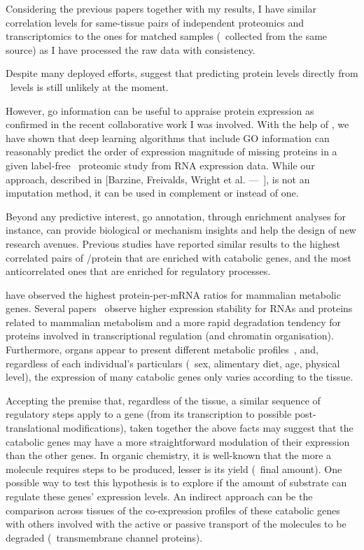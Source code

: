 Considering the previous papers together with my results,
I have similar correlation levels for same-tissue pairs of
independent proteomics and transcriptomics
to the ones for matched samples (\ie\ collected from the same source)
as I have processed the raw data with consistency.\mybr\

Despite many deployed efforts,
\citet{Franks2017-bp,Eraslan2019-md} suggest that
predicting protein levels directly from \mRNA\ levels
is still unlikely at the moment.\mybr\

However, \gls{go} information can be useful to appraise protein expression
as confirmed in the recent collaborative work I was involved.
With the help of \karlis,
we have shown that deep learning algorithms that include GO information
can reasonably predict the order of expression magnitude of missing proteins
in a given label-free \ms\ proteomic study from \gls{RNA} expression data.
While our approach, described in $\lbrack$Barzine,
Freivalds, Wright et al. ---~\cite{deepLearning2020}$\rbrack$,
is not an imputation method,
it can be used in complement or instead of one.\mybr\

Beyond any predictive interest,
\gls{go} annotation, through enrichment analyses for instance,
can provide biological or mechanism insights
and help the design of new research avenues.
Previous studies have reported similar results to
the highest correlated pairs of \mRNA/protein
that are enriched with catabolic genes,
and the most anticorrelated ones that are enriched for regulatory processes.\mybr\

\citet{Vogel2010-ux} have observed the highest protein-per-mRNA ratios
for mammalian metabolic genes.
Several papers~
observe higher expression stability for
\glspl{RNA} and proteins related to mammalian metabolism
and a more rapid degradation tendency
for proteins involved in transcriptional regulation (and chromatin organisation).
Furthermore, organs appear to present
different metabolic profiles~,
and, regardless of each individual's particulars
(\eg\ sex, alimentary diet, age, physical level),
the expression of many catabolic genes only varies according to the tissue.\mybr\

Accepting the premise that,
regardless of the tissue,
a similar sequence of regulatory steps apply to a gene
(from its transcription to possible post-translational modifications),
taken together the above facts may suggest that
the catabolic genes may have
a more straightforward modulation of their expression than the other genes.
In organic chemistry,
it is well-known that the more a molecule requires steps to be produced,
lesser is its yield (\ie\ final amount).
One possible way to test this hypothesis is to explore if
the amount of substrate can regulate these genes' expression levels.
An indirect approach can be
the comparison across tissues of the co-expression profiles of these catabolic genes
with others involved with the active or passive transport of the molecules
to be degraded (\eg\ transmembrane channel proteins).\mybr\

